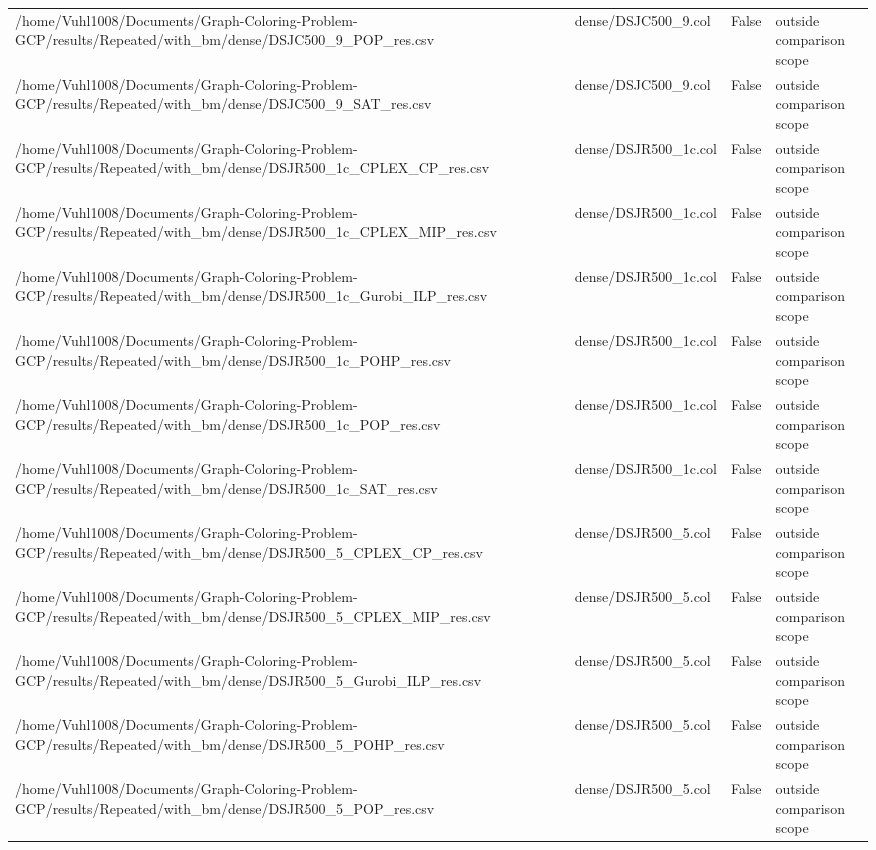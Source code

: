 \begin{table}[htbp]
\begin{tabular}{llll}
/home/Vuhl1008/Documents/Graph-Coloring-Problem-GCP/results/Repeated/with\_bm/dense/DSJC500\_9\_POP\_res.csv & dense/DSJC500\_9.col & False & outside comparison scope \\
/home/Vuhl1008/Documents/Graph-Coloring-Problem-GCP/results/Repeated/with\_bm/dense/DSJC500\_9\_SAT\_res.csv & dense/DSJC500\_9.col & False & outside comparison scope \\
/home/Vuhl1008/Documents/Graph-Coloring-Problem-GCP/results/Repeated/with\_bm/dense/DSJR500\_1c\_CPLEX\_CP\_res.csv & dense/DSJR500\_1c.col & False & outside comparison scope \\
/home/Vuhl1008/Documents/Graph-Coloring-Problem-GCP/results/Repeated/with\_bm/dense/DSJR500\_1c\_CPLEX\_MIP\_res.csv & dense/DSJR500\_1c.col & False & outside comparison scope \\
/home/Vuhl1008/Documents/Graph-Coloring-Problem-GCP/results/Repeated/with\_bm/dense/DSJR500\_1c\_Gurobi\_ILP\_res.csv & dense/DSJR500\_1c.col & False & outside comparison scope \\
/home/Vuhl1008/Documents/Graph-Coloring-Problem-GCP/results/Repeated/with\_bm/dense/DSJR500\_1c\_POHP\_res.csv & dense/DSJR500\_1c.col & False & outside comparison scope \\
/home/Vuhl1008/Documents/Graph-Coloring-Problem-GCP/results/Repeated/with\_bm/dense/DSJR500\_1c\_POP\_res.csv & dense/DSJR500\_1c.col & False & outside comparison scope \\
/home/Vuhl1008/Documents/Graph-Coloring-Problem-GCP/results/Repeated/with\_bm/dense/DSJR500\_1c\_SAT\_res.csv & dense/DSJR500\_1c.col & False & outside comparison scope \\
/home/Vuhl1008/Documents/Graph-Coloring-Problem-GCP/results/Repeated/with\_bm/dense/DSJR500\_5\_CPLEX\_CP\_res.csv & dense/DSJR500\_5.col & False & outside comparison scope \\
/home/Vuhl1008/Documents/Graph-Coloring-Problem-GCP/results/Repeated/with\_bm/dense/DSJR500\_5\_CPLEX\_MIP\_res.csv & dense/DSJR500\_5.col & False & outside comparison scope \\
/home/Vuhl1008/Documents/Graph-Coloring-Problem-GCP/results/Repeated/with\_bm/dense/DSJR500\_5\_Gurobi\_ILP\_res.csv & dense/DSJR500\_5.col & False & outside comparison scope \\
/home/Vuhl1008/Documents/Graph-Coloring-Problem-GCP/results/Repeated/with\_bm/dense/DSJR500\_5\_POHP\_res.csv & dense/DSJR500\_5.col & False & outside comparison scope \\
/home/Vuhl1008/Documents/Graph-Coloring-Problem-GCP/results/Repeated/with\_bm/dense/DSJR500\_5\_POP\_res.csv & dense/DSJR500\_5.col & False & outside comparison scope \\

\end{tabular}
\end{table}
